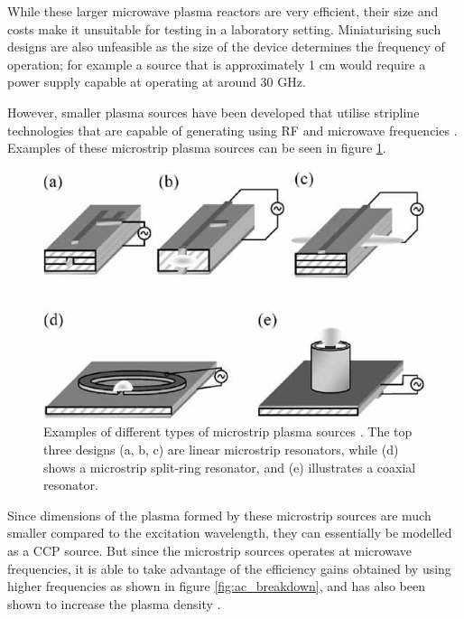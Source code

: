 While these larger microwave plasma reactors are very efficient, their size and costs make it unsuitable for testing in a laboratory setting. Miniaturising such designs are also unfeasible as the size of the device determines the frequency of operation; for example a source that is approximately 1 cm would require a power supply capable at operating at around 30 GHz. 

However, smaller plasma sources have been developed that utilise stripline technologies that are capable of generating using RF and microwave frequencies \cite{Pollak2007, Iza2003}. Examples of these microstrip plasma sources can be seen in figure \ref{fig:microstrip_microwave_discharge}. 


\begin{figure}[h!]
	\centering
	\includegraphics[width=0.8\linewidth]{chapter_2/figures/microstrip_microwave_discharge.jpg}
	\caption{Examples of different types of microstrip plasma sources \cite{Iza2008}. The top three designs (a, b, c) are linear microstrip resonators, while (d) shows a microstrip split-ring resonator, and (e) illustrates a coaxial resonator.}
	\label{fig:microstrip_microwave_discharge}
\end{figure} 

Since dimensions of the plasma formed by these microstrip sources are much smaller compared to the excitation wavelength, they can essentially be modelled as a CCP source. But since the microstrip sources operates at microwave frequencies, it is able to take advantage of the efficiency gains obtained by using higher frequencies as shown in figure \ref{fig:ac_breakdown}, and has also been shown to increase the plasma density \cite{Surendra1998}.

